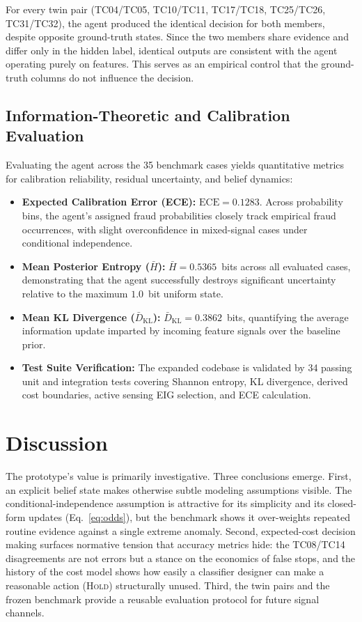 \documentclass{article}
\begin{document}
For every twin pair (TC04/TC05, TC10/TC11, TC17/TC18, TC25/TC26, TC31/TC32),
the agent produced the identical decision for both members, despite opposite
ground-truth states. Since the two members share evidence and differ only in
the hidden label, identical outputs are consistent with the agent operating
purely on features. This serves as an empirical control that the ground-truth
columns do not influence the decision.

\subsection{Information-Theoretic and Calibration Evaluation}

Evaluating the agent across the 35 benchmark cases yields quantitative metrics for calibration reliability, residual uncertainty, and belief dynamics:

\begin{itemize}
\item \textbf{Expected Calibration Error (ECE):} $\text{ECE} = 0.1283$. Across probability bins, the agent's assigned fraud probabilities closely track empirical fraud occurrences, with slight overconfidence in mixed-signal cases under conditional independence.
\item \textbf{Mean Posterior Entropy ($\bar{H}$):} $\bar{H} = 0.5365$~bits across all evaluated cases, demonstrating that the agent successfully destroys significant uncertainty relative to the maximum $1.0$~bit uniform state.
\item \textbf{Mean KL Divergence ($\bar{D}_{\text{KL}}$):} $\bar{D}_{\text{KL}} = 0.3862$~bits, quantifying the average information update imparted by incoming feature signals over the baseline prior.
\item \textbf{Test Suite Verification:} The expanded codebase is validated by 34 passing unit and integration tests covering Shannon entropy, KL divergence, derived cost boundaries, active sensing EIG selection, and ECE calculation.
\end{itemize}

\section{Discussion}

The prototype's value is primarily investigative. Three conclusions emerge.
First, an explicit belief state makes otherwise subtle modeling assumptions
visible. The conditional-independence assumption is attractive for its
simplicity and its closed-form updates (Eq.~\eqref{eq:odds}), but the benchmark
shows it over-weights repeated routine evidence against a single extreme
anomaly. Second, expected-cost decision making surfaces normative tension that
accuracy metrics hide: the TC08/TC14 disagreements are not errors but a
stance on the economics of false stops, and the history of the cost model shows
how easily a classifier designer can make a reasonable action
(\textsc{Hold}) structurally unused. Third, the twin pairs and the frozen
benchmark provide a reusable evaluation protocol for future signal channels.
\end{document}
